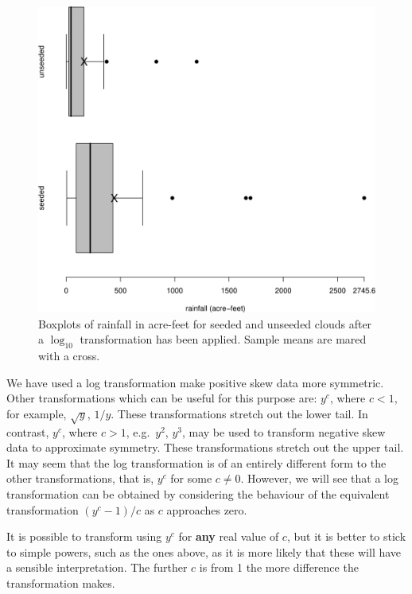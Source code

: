 \documentclass[
  11pt,
  british,
  openany, a4paper]{book}
\begin{document}
\begin{figure}

{\centering \includegraphics[width=0.75\linewidth]{images/cloud_box} 

}

\caption{Boxplots of rainfall in acre-feet for seeded and unseeded clouds after a $\log_{10}$ transformation has been applied.  Sample means are mared with a cross.}\label{fig:cloudboxlog}
\end{figure}

We have used a log transformation make positive skew data more symmetric. Other transformations which can be useful for this purpose are: \(y^c\), where \(c<1\), for example, \(\sqrt{y}\), \(1/y\). These transformations stretch out the lower tail. In contrast, \(y^c\), where \(c>1\), e.g.~\(y^2\), \(y^3\), may be used to transform negative skew data to approximate symmetry. These transformations stretch out the upper tail. It may seem that the log transformation is of an entirely different form to the other transformations, that is, \(y^c\) for some \(c \neq 0\). However, we will see that a log transformation can be obtained by considering the behaviour of the equivalent transformation \((y^c - 1) / c\) as \(c\) approaches zero.

It is possible to transform using \(y^c\) for \textbf{any} real value of \(c\), but it is better to stick to simple powers, such as the ones above, as it is more likely that these will have a sensible interpretation. The further \(c\) is from 1 the more difference the transformation makes.
\end{document}
